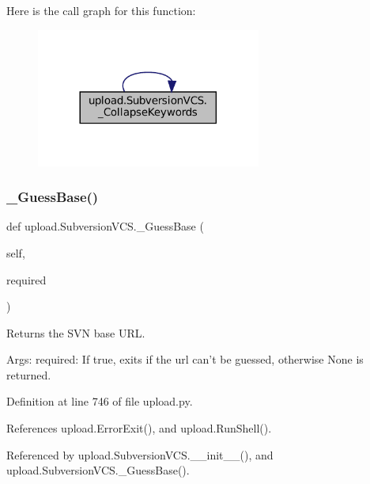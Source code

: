 Here is the call graph for this function\+:
\nopagebreak
\begin{figure}[H]
\begin{center}
\leavevmode
\includegraphics[width=209pt]{classupload_1_1SubversionVCS_ab484ddd61e217927fb61639bacdbb68d_cgraph}
\end{center}
\end{figure}
\mbox{\label{classupload_1_1SubversionVCS_ad257205675d7d9d291145f4aa405964b}} 
\subsubsection{\texorpdfstring{\+\_\+\+Guess\+Base()}{\_GuessBase()}\hspace{0.1cm}{\footnotesize\ttfamily [1/2]}}
{\footnotesize\ttfamily def upload.\+Subversion\+V\+C\+S.\+\_\+\+Guess\+Base (\begin{DoxyParamCaption}\item[{}]{self,  }\item[{}]{required }\end{DoxyParamCaption})\hspace{0.3cm}{\ttfamily [private]}}

\begin{DoxyVerb}Returns the SVN base URL.

Args:
  required: If true, exits if the url can't be guessed, otherwise None is
returned.
\end{DoxyVerb}
 

Definition at line 746 of file upload.\+py.



References upload.\+Error\+Exit(), and upload.\+Run\+Shell().



Referenced by upload.\+Subversion\+V\+C\+S.\+\_\+\+\_\+init\+\_\+\+\_\+(), and upload.\+Subversion\+V\+C\+S.\+\_\+\+Guess\+Base().


